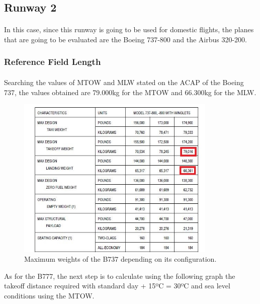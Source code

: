 		\subsection{Runway 2}
		\paragraph{}In this case, since this runway is going to be used for domestic flights, the planes that are going to be evaluated are the Boeing 737-800 and the Airbus 320-200.
		
		\subsubsection{Reference Field Length}
		\paragraph{}Searching the values of MTOW and MLW stated on the ACAP of the Boeing 737, the values obtained are 79.000kg for the MTOW and 66.300kg for the MLW.
		
		\begin{figure}[H]
			\centering
			\includegraphics[clip, trim=0cm 0cm 0cm 0cm, width=0.85\textwidth]{./images/B737/B737MTOW}
			\caption{Maximum weights of the B737 depending on its configuration.} %
			\label{} %
		\end{figure}
	
		As for the B777, the next step is to calculate using the following graph the takeoff distance required with standard day + 15ºC = 30ºC and sea level conditions using the MTOW.
		
